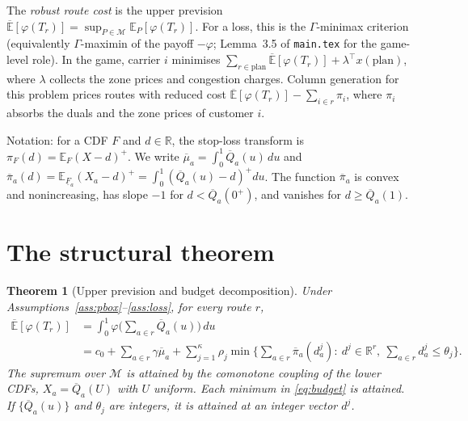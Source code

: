 \documentclass[11pt]{article}
\newtheorem{theorem}{Theorem}[section]
\theoremstyle{definition}
\newcommand{\R}{\mathbb{R}}
\newcommand{\E}{\mathbb{E}}
\newcommand{\Eu}{\overline{\mathbb{E}}}
\newcommand{\Qb}{\overline{Q}}
\newcommand{\Fl}{\underline{F}}
\newcommand{\pib}{\overline{\pi}}
\newcommand{\mub}{\overline{\mu}}
\newcommand{\cM}{\mathcal{M}}
\newcommand{\pos}[1]{\left(#1\right)^{+}}
\begin{document}
The \emph{robust route cost} is the upper prevision $\Eu[\varphi(T_r)]=\sup_{P\in\cM}\E_P[\varphi(T_r)]$. For a loss, this is the $\Gamma$-minimax criterion (equivalently $\Gamma$-maximin of the payoff $-\varphi$; Lemma~3.5 of \texttt{main.tex} for the game-level role). In the game, carrier $i$ minimises $\sum_{r\in\text{plan}}\Eu[\varphi(T_r)]+\lambda^\top x(\text{plan})$, where $\lambda$ collects the zone prices and congestion charges. Column generation for this problem prices routes with reduced cost $\Eu[\varphi(T_r)]-\sum_{i\in r}\pi_i$, where $\pi_i$ absorbs the duals and the zone prices of customer $i$.

Notation: for a CDF $F$ and $d\in\R$, the stop-loss transform is $\pi_F(d)=\E_F\pos{X-d}$. We write $\mub_a=\int_0^1\Qb_a(u)\,du$ and $\pib_a(d)=\E_{\Fl_a}\pos{X_a-d}=\int_0^1\pos{\Qb_a(u)-d}du$. The function $\pib_a$ is convex and nonincreasing, has slope $-1$ for $d<\Qb_a(0^+)$, and vanishes for $d\ge\Qb_a(1)$.

\section{The structural theorem}\label{sec:struct}

\begin{theorem}[Upper prevision and budget decomposition]\label{thm:main}
Under Assumptions~\ref{ass:pbox}--\ref{ass:loss}, for every route $r$,
\begin{align}
\Eu[\varphi(T_r)]
&=\int_0^1\varphi\Big(\sum_{a\in r}\Qb_a(u)\Big)\,du \label{eq:comon}\\
&=c_0+\sum_{a\in r}\gamma\mub_a+\sum_{j=1}^{\kappa}\rho_j\min\Big\{\sum_{a\in r}\pib_a(d^j_a):\ d^j\in\R^{r},\ \sum_{a\in r}d^j_a\le\theta_j\Big\}. \label{eq:budget}
\end{align}
The supremum over $\cM$ is attained by the comonotone coupling of the lower CDFs, $X_a=\Qb_a(U)$ with $U$ uniform. Each minimum in \eqref{eq:budget} is attained. If $\{\Qb_a(u)\}$ and $\theta_j$ are integers, it is attained at an integer vector $d^j$.
\end{theorem}
\end{document}
